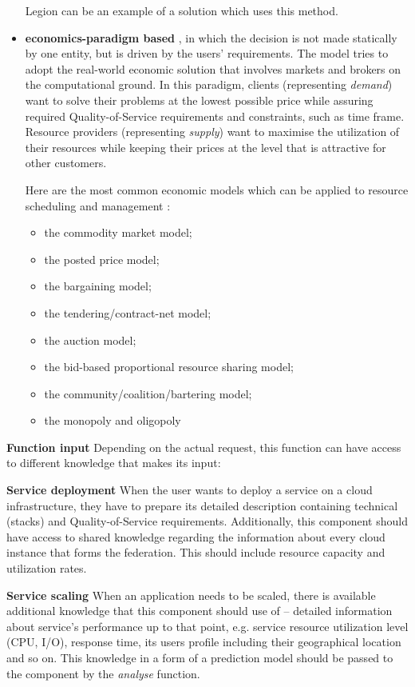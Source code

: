 \begin{asparaenum}
\begin{itemize}
      Legion \cite{chapin1999legion} can be an example of a solution which uses this method.
    \item \textbf{economics-paradigm based} \cite{buyya2001case}, in which the decision is not made statically by one entity, but is driven by the users' requirements. The model tries to adopt the real-world economic solution that involves markets and brokers on the computational ground. In this paradigm, clients (representing \emph{demand}) want to solve their problems at the lowest possible price while assuring required Quality-of-Service requirements and constraints, such as time frame. Resource providers (representing \emph{supply}) want to maximise the utilization of their resources while keeping their prices at the level that is attractive for other customers.
      
      Here are the most common economic models which can be applied to resource scheduling and management \cite{buyya2002economic}:
      \begin{itemize}
        \item the commodity market model;
        \item the posted price model;
        \item the bargaining model;
        \item the tendering/contract-net model;
        \item the auction model;
        \item the bid-based proportional resource sharing model;
        \item the community/coalition/bartering model;
        \item the monopoly and oligopoly
      \end{itemize}
  \end{itemize}

\item[\textbf{Function input}] Depending on the actual request, this function can have access to different knowledge that makes its input:

  \begin{asparaenum}
  \item[\textbf{Service deployment}] When the user wants to deploy a service on a cloud infrastructure, they have to prepare its detailed description containing technical (stacks) and Quality-of-Service requirements. Additionally, this component should have access to shared knowledge regarding the information about every cloud instance that forms the federation. This should include resource capacity and utilization rates.
  \item[\textbf{Service scaling}] When an application needs to be scaled, there is available additional knowledge that this component should use of -- detailed information about service's performance up to that point, e.g. service resource utilization level (CPU, I/O), response time, its users profile including their geographical location and so on. This knowledge in a form of a prediction model should be passed to the component by the \emph{analyse} function.
  \end{asparaenum}


\end{asparaenum}
